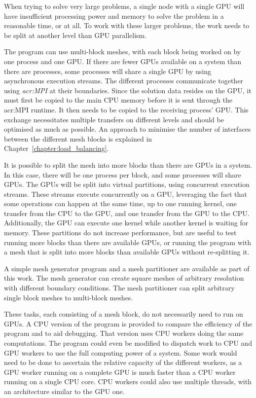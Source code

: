 When trying to solve very large problems, a single node with a single GPU will have insufficient
processing power and memory to solve the problem in a reasonable time, or at all. To work with these
larger problems, the work needs to be split at another level than GPU parallelism.  

The program can use multi-block meshes, with each block being worked on by one process and one GPU.
If there are fewer GPUs available on a system than there are processes, some processes will share a
single GPU by using asynchronous execution streams. The different processes communicate together
using \textit{\acrfull{acr:MPI}} at their boundaries. Since the solution data resides on the GPU, it
must first be copied to the main CPU memory before it is sent through the \acrshort{acr:MPI}
runtime. It then needs to be copied to the receiving process' GPU. This exchange necessitates
multiple transfers on different levels and should be optimised as much as possible. An approach to
minimise the number of interfaces between the different mesh blocks is explained in
Chapter~\ref{chapter:load_balancing}. 

It is possible to split the mesh into more blocks than there are GPUs in a system. In this case,
there will be one process per block, and some processes will share GPUs. The GPUs will be split into
virtual partitions, using concurrent execution streams. These streams execute concurrently on a GPU,
leveraging the fact that some operations can happen at the same time, up to one running kernel, one
transfer from the CPU to the GPU, and one transfer from the GPU to the CPU. Additionally, the GPU
can execute one kernel while another kernel is waiting for memory. These partitions do not increase
performance, but are useful to test running more blocks than there are available GPUs, or running
the program with a mesh that is split into more blocks than available GPUs without re-splitting it.

A simple mesh generator program and a mesh partitioner are available as part of this work. The mesh
generator can create square meshes of arbitrary resolution with different boundary conditions. The
mesh partitioner can split arbitrary single block meshes to multi-block meshes.

These tasks, each consisting of a mesh block, do not necessarily need to run on GPUs. A CPU version
of the program is provided to compare the efficiency of the program and to aid debugging. That
version uses CPU workers doing the same computations. The program could even be modified to dispatch
work to CPU and GPU workers to use the full computing power of a system. Some work would need to be
done to ascertain the relative capacity of the different workers, as a GPU worker running on a
complete GPU is much faster than a CPU worker running on a single CPU core. CPU workers could also
use multiple threads, with an architecture similar to the GPU one.

